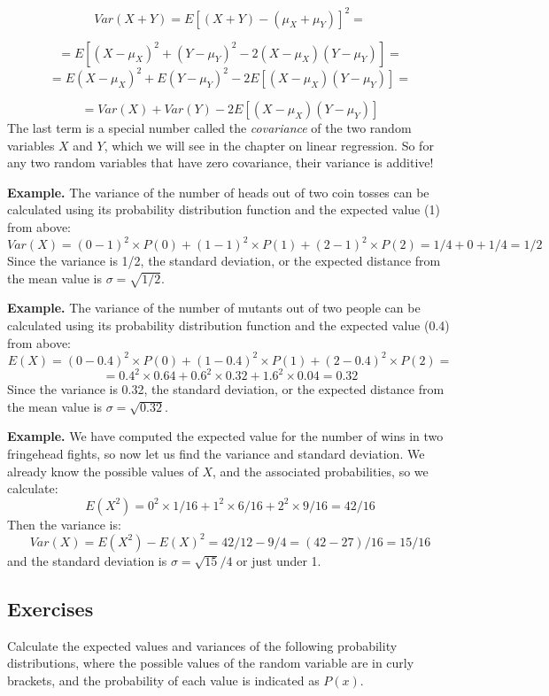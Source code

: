 \documentclass[
  letterpaper,
  DIV=11,
  numbers=noendperiod]{scrreprt}
\begin{document}
\[Var(X+Y) = E \left[ (X+Y)-(\mu_X+\mu_Y) \right]^2 =\]

\[ = E[ (X-\mu_X)^2 +(Y-\mu_Y)^2 - 2(X-\mu_X)(Y-\mu_Y)] = \]
\[=E (X-\mu_X)^2 +  E(Y-\mu_Y)^2   -2 E[(X-\mu_X)(Y-\mu_Y)] = \]

\[ = Var(X) + Var(Y)  -2 E[(X-\mu_X)(Y-\mu_Y)] \]The last term is a
special number called the \emph{covariance} of the two random variables
\(X\) and \(Y\), which we will see in the chapter on linear regression.
So for any two random variables that have zero covariance, their
variance is additive!

\textbf{Example.} The variance of the number of heads out of two coin
tosses can be calculated using its probability distribution function and
the expected value (1) from above:
\[ Var(X) = (0-1)^2 \times P(0) + (1-1)^2 \times P(1) + (2-1)^2 \times P(2) = 1/4+0+1/4 = 1/2\]
Since the variance is 1/2, the standard deviation, or the expected
distance from the mean value is \(\sigma= \sqrt{1/2}\).

\textbf{Example.} The variance of the number of mutants out of two
people can be calculated using its probability distribution function and
the expected value (0.4) from above:
\[ E(X) = (0-0.4)^2 \times P(0) + (1-0.4)^2 \times P(1) + (2-0.4)^2 \times P(2) =\]
\[ = 0.4^2 \times 0.64+0.6^2 \times 0.32+1.6^2 \times 0.04 = 0.32\]
Since the variance is 0.32, the standard deviation, or the expected
distance from the mean value is \(\sigma= \sqrt{0.32}\).

\textbf{Example.} We have computed the expected value for the number of
wins in two fringehead fights, so now let us find the variance and
standard deviation. We already know the possible values of \(X\), and
the associated probabilities, so we calculate:
\[ E(X^2) = 0^2 \times 1/16 + 1^2 \times 6/16 + 2^2 \times 9/16 = 42/16\]
Then the variance is:
\[ Var(X) = E(X^2)  - E(X)^2 = 42/12 - 9/4 = (42-27)/16 = 15/16\] and
the standard deviation is \(\sigma = \sqrt{15}/4\) or just under 1.

\hypertarget{exercises-23}{%
\subsection{Exercises}\label{exercises-23}}

Calculate the expected values and variances of the following probability
distributions, where the possible values of the random variable are in
curly brackets, and the probability of each value is indicated as
\(P(x)\).
\end{document}

